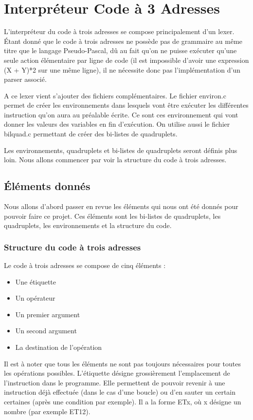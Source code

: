 \documentclass{article}
\begin{document}
\newpage
\section{Interpréteur Code à 3 Adresses}

L'interpréteur du code à trois adresses se compose principalement d'un lexer. Étant donné que le code à trois adresses ne possède pas de grammaire au même titre que le langage Pseudo-Pascal,
dû au fait qu'on ne puisse exécuter qu'une seule action élémentaire par ligne de code (il est impossible d'avoir une expression (X + Y)*2 sur une même ligne), il ne nécessite donc pas l'implémentation d'un parser associé.

A ce lexer vient s'ajouter des fichiers complémentaires. Le fichier environ.c permet de créer les environnements dans lesquels vont être exécuter les différentes instruction qu'on aura au préalable écrite. Ce sont ces environnement qui vont donner les valeurs des variables en fin d'exécution.
On utilise aussi le fichier bilquad.c permettant de créer des bi-listes de quadruplets.

Les environnements, quadruplets et bi-listes de quadruplets seront définis plus loin. Nous allons commencer par voir la structure du code à trois adresses.


\subsection{Éléments donnés}
Nous allons d'abord passer en revue les éléments qui nous ont été donnés pour pouvoir faire ce projet. Ces éléments sont les bi-listes de quadruplets, les quadruplets, les environnements et la structure du code.
\subsubsection{Structure du code à trois adresses}

Le code à trois adresses se compose de cinq éléments :
\begin{itemize}
\item Une étiquette
\item Un opérateur
\item Un premier argument
\item Un second argument
\item La destination de l’opération
\end{itemize}

Il est à noter que tous les éléments ne sont pas toujours nécessaires pour toutes les opérations possibles.
\medbreak
L'étiquette désigne grossièrement l'emplacement de l'instruction dans le programme. Elle permettent de pouvoir revenir à une instruction déjà effectuée (dans le cas d'une boucle) ou d'en sauter un certain certaines (après une condition par exemple). Il a la forme ETx, où x désigne un nombre (par exemple ET12).
\end{document}
